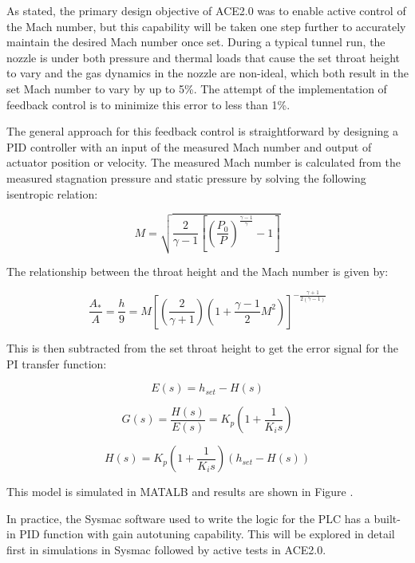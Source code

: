 As stated, the primary design objective of ACE2.0 was to enable active control of the Mach number, but this capability will be taken one step further to accurately maintain the desired Mach number once set. During a typical tunnel run, the nozzle is under both pressure and thermal loads that cause the set throat height to vary and the gas dynamics in the nozzle are non-ideal, which both result in the set Mach number to vary by up to 5\%. The attempt of the implementation of feedback control is to minimize this error to less than 1\%.

The general approach for this feedback control is straightforward by designing a PID controller with an input of the measured Mach number and output of actuator position or velocity. The measured Mach number is calculated from the measured stagnation pressure and static pressure by solving the following isentropic relation:

\begin{equation} 
    M = \sqrt{\frac{2}{\gamma - 1} \left[\left(\frac{P_0}{P}\right)^{\frac{\gamma - 1}{\gamma}} - 1\right]}
\end{equation}

The relationship between the throat height and the Mach number is given by:

\begin{equation}
    \frac{A_*}{A} = \frac{h}{9} = M \left[ \left( \frac{2}{\gamma+1}  \right) \left( 1 + \frac{\gamma-1}{2} M^2  \right) \right]^{-\frac{\gamma+1}{2(\gamma-1)} }
\end{equation}

This is then subtracted from the set throat height to get the error signal for the PI transfer function:

\begin{equation}
    E(s) = h_{set} - H(s)
\end{equation}

\begin{equation}
    G(s) = \frac{H(s)}{E(s)} = K_p \left(1 + \frac{1}{K_i s}\right)
\end{equation}

\begin{equation}
    H(s) = K_p \left(1 + \frac{1}{K_i s}\right) \left(h_{set} - H(s)\right)
\end{equation}

This model is simulated in MATALB and results are shown in Figure .

In practice, the Sysmac software used to write the logic for the PLC has a built-in PID function with gain autotuning capability. This will be explored in detail first in simulations in Sysmac followed by active tests in ACE2.0. 

